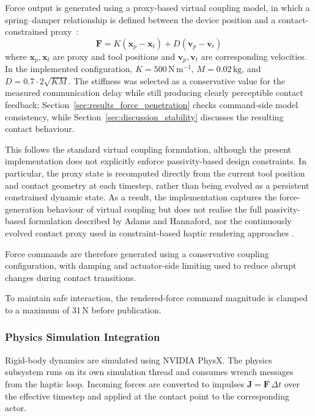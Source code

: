 Force output is generated using a proxy-based virtual coupling model, in which a spring--damper relationship is defined between the device position and a contact-constrained proxy~\cite{adamsStableHapticInteraction1999}:
\[
\mathbf{F} = K\left(\mathbf{x}_{p}-\mathbf{x}_{t}\right) + D\left(\mathbf{v}_{p}-\mathbf{v}_{t}\right)
\]
where \(\mathbf{x}_{p},\mathbf{x}_{t}\) are proxy and tool positions and \(\mathbf{v}_{p},\mathbf{v}_{t}\) are corresponding velocities. In the implemented configuration, \(K=500\,\mathrm{N\,m^{-1}}\), \(M=0.02\,\mathrm{kg}\), and \(D = 0.7\cdot 2\sqrt{KM}\). The stiffness was selected as a conservative value for the measured communication delay while still producing clearly perceptible contact feedback; Section~\ref{sec:results_force_penetration} checks command-side model consistency, while Section~\ref{sec:discussion_stability} discusses the resulting contact behaviour.

This follows the standard virtual coupling formulation, although the present implementation does not explicitly enforce passivity-based design constraints. In particular, the proxy state is recomputed directly from the current tool position and contact geometry at each timestep, rather than being evolved as a persistent constrained dynamic state. As a result, the implementation captures the force-generation behaviour of virtual coupling but does not realise the full passivity-based formulation described by Adams and Hannaford, nor the continuously evolved contact proxy used in constraint-based haptic rendering approaches \cite{zillesConstraintbasedGodobjectMethod1995,ruspiniHapticDisplayComplex1997,salisburyHapticRenderingSurfaces1997}.

Force commands are therefore generated using a conservative coupling configuration, with damping and actuator-side limiting used to reduce abrupt changes during contact transitions.

To maintain safe interaction, the rendered-force command magnitude is clamped to a maximum of 31\,N before publication.

\subsubsection{Physics Simulation Integration}

Rigid-body dynamics are simulated using NVIDIA PhysX. The physics subsystem runs on its own simulation thread and consumes wrench messages from the haptic loop. Incoming forces are converted to impulses \(\mathbf{J}=\mathbf{F}\,\Delta t\) over the effective timestep and applied at the contact point to the corresponding actor.

